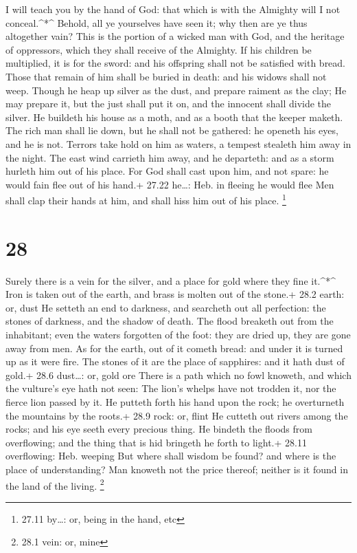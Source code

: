  I will teach you by the hand of God: that which is with
the Almighty will I not conceal.\^{}*\^{}  Behold, all ye
yourselves have seen it; why then are ye thus altogether vain?
 This is the portion of a wicked man with God, and the
heritage of oppressors, which they shall receive of the Almighty.
 If his children be multiplied, it is for the sword: and
his offspring shall not be satisfied with bread.  Those
that remain of him shall be buried in death: and his widows shall not
weep.  Though he heap up silver as the dust, and prepare
raiment as the clay;  He may prepare it, but the just shall
put it on, and the innocent shall divide the silver.  He
buildeth his house as a moth, and as a booth that the keeper maketh.
 The rich man shall lie down, but he shall not be gathered:
he openeth his eyes, and he is not.  Terrors take hold on
him as waters, a tempest stealeth him away in the night. 
The east wind carrieth him away, and he departeth: and as a storm
hurleth him out of his place.  For God shall cast upon him,
and not spare: he would fain flee out of his hand.+ 27.22 he\ldots: Heb.
in fleeing he would flee  Men shall clap their hands at
him, and shall hiss him out of his place. \footnote{27.11 by\ldots: or,
  being in the hand, etc}

\hypertarget{section-27}{%
\section{28}\label{section-27}}

 Surely there is a vein for the silver, and a place for gold
where they fine it.\^{}*\^{}  Iron is taken out of the
earth, and brass is molten out of the stone.+ 28.2 earth: or, dust
 He setteth an end to darkness, and searcheth out all
perfection: the stones of darkness, and the shadow of death.
 The flood breaketh out from the inhabitant; even the waters
forgotten of the foot: they are dried up, they are gone away from men.
 As for the earth, out of it cometh bread: and under it is
turned up as it were fire.  The stones of it are the place
of sapphires: and it hath dust of gold.+ 28.6 dust\ldots: or, gold ore
 There is a path which no fowl knoweth, and which the
vulture's eye hath not seen:  The lion's whelps have not
trodden it, nor the fierce lion passed by it.  He putteth
forth his hand upon the rock; he overturneth the mountains by the
roots.+ 28.9 rock: or, flint  He cutteth out rivers among
the rocks; and his eye seeth every precious thing.  He
bindeth the floods from overflowing; and the thing that is hid bringeth
he forth to light.+ 28.11 overflowing: Heb. weeping  But
where shall wisdom be found? and where is the place of understanding?
 Man knoweth not the price thereof; neither is it found in
the land of the living. \footnote{28.1 vein: or, mine}

